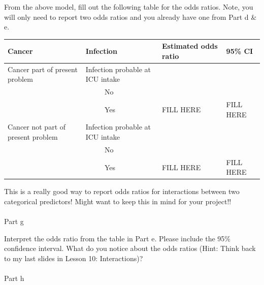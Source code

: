 \documentclass[
  letterpaper,
  DIV=11,
  numbers=noendperiod]{scrartcl}
\makeatletter
\let\oldparagraph\paragraph
\renewcommand{\paragraph}{
    \@ifstar
      \xxxParagraphStar
      \xxxParagraphNoStar
  }
\newcommand{\xxxParagraphStar}[1]{\oldparagraph*{#1}\mbox{}}
\newcommand{\xxxParagraphNoStar}[1]{\oldparagraph{#1}\mbox{}}
\makeatother
\begin{document}
From the above model, fill out the following table for the odds ratios.
Note, you will only need to report two odds ratios and you already have
one from Part d \& e.

\begin{longtable}[]{@{}
  >{\raggedright\arraybackslash}p{}
  >{\raggedright\arraybackslash}p{}
  >{\raggedright\arraybackslash}p{}
  >{\raggedright\arraybackslash}p{}@{}}
\toprule\noalign{}
\begin{minipage}[b]{\linewidth}\raggedright
Cancer
\end{minipage} & \begin{minipage}[b]{\linewidth}\raggedright
Infection
\end{minipage} & \begin{minipage}[b]{\linewidth}\raggedright
Estimated odds ratio
\end{minipage} & \begin{minipage}[b]{\linewidth}\raggedright
95\% CI
\end{minipage} \\
\midrule\noalign{}
\endhead
\bottomrule\noalign{}
\endlastfoot
Cancer part of present problem & Infection probable at ICU intake & & \\
& ~ ~ ~~No & & \\
& ~ ~ ~~Yes & FILL HERE & FILL HERE \\
Cancer not part of present problem & Infection probable at ICU intake &
& \\
& ~ ~ ~~No & & \\
& ~ ~ ~~Yes & FILL HERE & FILL HERE \\
\end{longtable}

This is a really good way to report odds ratios for interactions between
two categorical predictors! Might want to keep this in mind for your
project!!

\paragraph{Part g}\label{part-g}

Interpret the odds ratio from the table in Part e. Please include the
95\% confidence interval. What do you notice about the odds ratios
(Hint: Think back to my last slides in Lesson 10: Interactions)?

\paragraph{Part h}\label{part-h}
\end{document}
